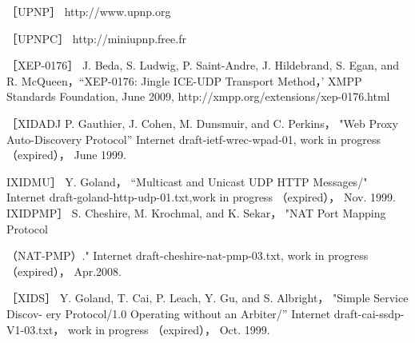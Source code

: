 ［UPNP］ http://www.upnp.org

［UPNPC］ http://miniupnp.free.fr

［XEP-0176］ J. Beda, S. Ludwig, P. Saint-Andre, J. Hildebrand, S. Egan, and R.
McQueen，“XEP-0176: Jingle ICE-UDP Transport Method，' XMPP Standards
Foundation, June 2009, http://xmpp.org/extensions/xep-0176.html

［XIDADJ P. Gauthier, J. Cohen, M. Dunsmuir, and C. Perkins， "Web Proxy
Auto-Discovery Protocol” Internet draft-ietf-wrec-wpad-01, work in progress
（expired）， June 1999.

IXIDMU］ Y. Goland， “Multicast and Unicast UDP HTTP Messages/" Internet
draft-goland-http-udp-01.txt,work in progress （expired）， Nov. 1999.
IXIDPMP］ S. Cheshire, M. Krochmal, and K. Sekar， "NAT Port Mapping Protocol

（NAT-PMP）." Internet draft-cheshire-nat-pmp-03.txt, work in progress （expired），
Apr.2008.

［XIDS］ Y. Goland, T. Cai, P. Leach, Y. Gu, and S. Albright， "Simple
Service Discov-
ery Protocol/1.0 Operating without an Arbiter/” Internet
draft-cai-ssdp-V1-03.txt，
work in progress （expired）， Oct. 1999.
